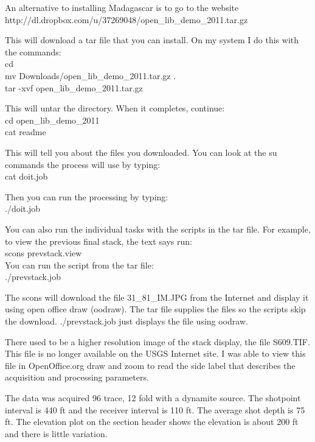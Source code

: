 An alternative to installing Madagascar is to go to the website\\
http://dl.dropbox.com/u/37269048/open\_lib\_demo\_2011.tar.gz

This will download a tar file that you can install.  On my system I
do this with the commands:\\
cd\\
mv Downloads/open\_lib\_demo\_2011.tar.gz . \\
tar -xvf open\_lib\_demo\_2011.tar.gz

This will untar the directory.  When it completes, continue:\\
cd open\_lib\_demo\_2011\\
cat readme

This will tell you about the files you downloaded.  You can look at the 
su commands the process will use by typing:\\
cat doit.job

Then you can run the processing by typing:\\  
./doit.job

You can also run the individual tasks with the scripts in the tar file. 
For example, to view the previous final stack, the text says run:\\
scons prevstack.view \\

You can run the script from the tar file:\\
./prevstack.job

The scons will download the file 31\_81\_IM.JPG from the Internet and 
display it using open office draw (oodraw).  The tar file supplies the 
files so the scripts skip the download.  ./prevstack.job just displays
the file using oodraw.

There used to be a higher resolution image of the stack display, the 
file S609.TIF.  This file is no longer available on the USGS Internet 
site.  I was able to view this file in OpenOffice.org draw 
and zoom to read the side label that describes the acquisition and 
processing parameters.

The data was acquired 96 trace, 12 fold with a dynamite source.  The
shotpoint interval is 440 ft and the receiver interval is 110 ft.  The
average shot depth is 75 ft.  The elevation plot on the section header
shows the elevation is about 200 ft and there is little variation.

